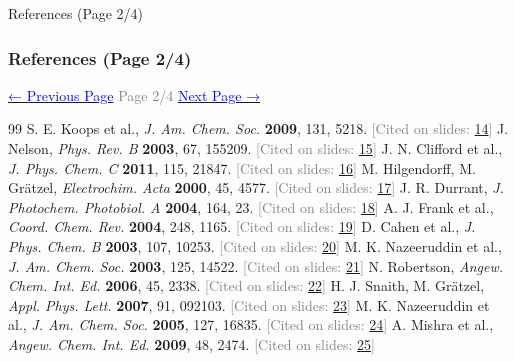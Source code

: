 \documentclass[aspectratio=169]{beamer}
\begin{document}
\begin{frame}[allowframebreaks]{References (Page 2/4)}
\frametitle{References (Page 2/4)}
\vspace{0.5em}\begin{center}\hyperlink{page.1}{\textcolor{blue}{\small ← Previous Page}} \hfill \textcolor{gray}{\small Page 2/4} \hfill \hyperlink{page.3}{\textcolor{blue}{\small Next Page →}}\end{center}

\begin{thebibliography}{99}
 S. E. Koops et al., \textit{J. Am. Chem. Soc.} \textbf{2009}, 131, 5218. \hfill\textcolor{gray}{\tiny [Cited on slides: \hyperlink{page.14}{14}]}
 J. Nelson, \textit{Phys. Rev. B} \textbf{2003}, 67, 155209. \hfill\textcolor{gray}{\tiny [Cited on slides: \hyperlink{page.15}{15}]}
 J. N. Clifford et al., \textit{J. Phys. Chem. C} \textbf{2011}, 115, 21847. \hfill\textcolor{gray}{\tiny [Cited on slides: \hyperlink{page.16}{16}]}
 M. Hilgendorff, M. Grätzel, \textit{Electrochim. Acta} \textbf{2000}, 45, 4577. \hfill\textcolor{gray}{\tiny [Cited on slides: \hyperlink{page.17}{17}]}
 J. R. Durrant, \textit{J. Photochem. Photobiol. A} \textbf{2004}, 164, 23. \hfill\textcolor{gray}{\tiny [Cited on slides: \hyperlink{page.18}{18}]}
 A. J. Frank et al., \textit{Coord. Chem. Rev.} \textbf{2004}, 248, 1165. \hfill\textcolor{gray}{\tiny [Cited on slides: \hyperlink{page.19}{19}]}
 D. Cahen et al., \textit{J. Phys. Chem. B} \textbf{2003}, 107, 10253. \hfill\textcolor{gray}{\tiny [Cited on slides: \hyperlink{page.20}{20}]}
 M. K. Nazeeruddin et al., \textit{J. Am. Chem. Soc.} \textbf{2003}, 125, 14522. \hfill\textcolor{gray}{\tiny [Cited on slides: \hyperlink{page.21}{21}]}
 N. Robertson, \textit{Angew. Chem. Int. Ed.} \textbf{2006}, 45, 2338. \hfill\textcolor{gray}{\tiny [Cited on slides: \hyperlink{page.22}{22}]}
 H. J. Snaith, M. Grätzel, \textit{Appl. Phys. Lett.} \textbf{2007}, 91, 092103. \hfill\textcolor{gray}{\tiny [Cited on slides: \hyperlink{page.23}{23}]}
 M. K. Nazeeruddin et al., \textit{J. Am. Chem. Soc.} \textbf{2005}, 127, 16835. \hfill\textcolor{gray}{\tiny [Cited on slides: \hyperlink{page.24}{24}]}
 A. Mishra et al., \textit{Angew. Chem. Int. Ed.} \textbf{2009}, 48, 2474. \hfill\textcolor{gray}{\tiny [Cited on slides: \hyperlink{page.25}{25}]}
\end{thebibliography}
\end{frame}
\end{document}
